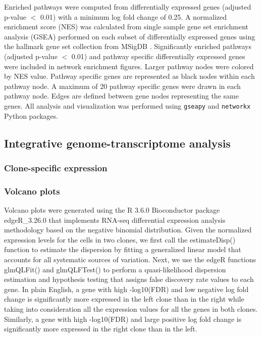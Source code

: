 \documentclass{article}
\begin{document}
Enriched pathways were computed from differentially expressed genes (adjusted p-value $<$ 0.01) with a minimum log fold change of 0.25.  A normalized enrichment score (NES) was calculated from single sample gene set enrichment analysis (GSEA) \cite{shi2007gene} performed on each subset of differentially expressed genes using the hallmark gene set collection from MSigDB \cite{liberzon2015molecular}.  Significantly enriched pathways (adjusted p-value $<$ 0.01) and pathway specific differentially expressed genes were included in network enrichment figures.  Larger pathway nodes were colored by NES value. Pathway specific genes are represented as black nodes within each pathway node.  A maximum of 20 pathway specific genes were drawn in each pathway node.  Edges are defined between gene nodes representing the same genes.  All analysis and visualization was performed using \texttt{gseapy} and \texttt{networkx} \cite{hagberg2008exploring} Python packages.


\subsection{Integrative genome-transcriptome analysis}




\subsubsection{Clone-specific expression}

\subsubsection{Volcano plots}
Volcano plots were generated using the R 3.6.0 Bioconductor package edgeR\_3.26.0 that implements RNA-seq differential expression analysis methodology based on the negative binomial distribution. Given the normalized expression levels for the cells in two clones, we first call the estimateDisp() function to estimate the dispersion by fitting a generalized linear model that accounts for all systematic sources of variation. Next, we use the edgeR functions glmQLFit() and glmQLFTest() to perform a quasi-likelihood dispersion estimation and hypothesis testing that assigns false discovery rate values to each gene. In plain English, a gene with high -log10(FDR) and low negative log fold change is significantly more expressed in the left clone than in the right while taking into consideration all the expression values for all the genes in both clones. Similarly, a gene with high -log10(FDR) and large positive log fold change is significantly more expressed in the right clone than in the left. 
\end{document}

